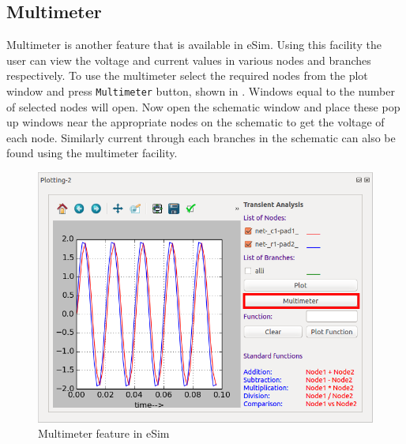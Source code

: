 \subsection{Multimeter}
Multimeter is another feature that is available in eSim. Using this facility the user can view the voltage and current values in various nodes and branches respectively. To use the multimeter select the required nodes from the plot window and press {\tt Multimeter} button, shown in . Windows equal to the number of selected nodes will open. Now open the schematic window and place these pop up windows near the appropriate nodes on the schematic to get the voltage of each node. Similarly current through each branches in the schematic can also be found using the multimeter facility.

\begin{figure}
\centering
\includegraphics[width=\lgfig]{manual_images/multimeter.png}
\caption{Multimeter feature in eSim}
\label{multimeter}
\end{figure}


